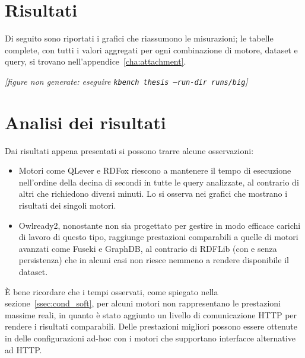 \section{Risultati}
\label{sec:results}

Di seguito sono riportati i grafici che riassumono le misurazioni; le tabelle complete, con tutti i valori
aggregati per ogni combinazione di motore, dataset e query, si trovano nell'appendice~\ref{cha:attachment}.

  {\textit{[figure non generate: eseguire \texttt{kbench thesis --run-dir runs/big}]}}

\clearpage

\section{Analisi dei risultati}
\label{sec:results_analysis}

Dai risultati appena presentati si possono trarre alcune osservazioni:
\begin{itemize}
\item Motori come QLever e RDFox riescono a mantenere il tempo di esecuzione nell'ordine della decina di secondi in tutte le query 
analizzate, al contrario di altri che richiedono diversi minuti. Lo si osserva nei grafici che mostrano i risultati dei singoli motori.
\item Owlready2, nonostante non sia progettato per gestire in modo efficace carichi di lavoro di questo tipo, raggiunge prestazioni
comparabili a quelle di motori avanzati come Fuseki e GraphDB, al contrario di RDFLib (con e senza persistenza) che in
alcuni casi non riesce nemmeno a rendere disponibile il dataset.
\end{itemize}

È bene ricordare che i tempi osservati, come spiegato nella sezione~\ref{ssec:cond_soft}, per alcuni motori non rappresentano
le prestazioni massime reali, in quanto è stato aggiunto un livello di comunicazione HTTP per rendere i risultati comparabili.
Delle prestazioni migliori possono essere ottenute in delle configurazioni ad-hoc con i motori che supportano interfacce alternative
ad HTTP.

